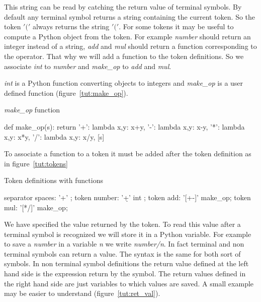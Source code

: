 This string can be read by catching the return value of terminal symbols. By default any terminal symbol returns a string containing the current token. So the token $'('$ always returns the string $'('$. For some tokens it may be useful to compute a Python object from the token. For example \emph{number} should return an integer instead of a string, \emph{add} and \emph{mul} should return a function corresponding to the operator. That why we will add a function to the token definitions. So we associate \emph{int} to \emph{number} and \emph{make\_op} to \emph{add} and \emph{mul}.

\emph{int} is a Python function converting objects to integers and \emph{make\_op} is a user defined function (figure~\ref{tut:make_op}).

\begin{code}
\caption{\emph{make\_op} function} \label{tut:make_op}
\begin{verbatimtab}[4]
def make_op(s):
	return {
		'+': lambda x,y: x+y,
		'-': lambda x,y: x-y,
		'*': lambda x,y: x*y,
		'/': lambda x,y: x/y,
	}[s]
\end{verbatimtab}
\end{code}

To associate a function to a token it must be added after the token definition as in figure~\ref{tut:tokens}

\begin{code}
\caption{Token definitions with functions} \label{tut:tokens}
\begin{verbatimtab}[4]
	separator spaces: '\s+' ;
	token number: '\d+' int ;
	token add: '[+-]' make_op;
	token mul: '[*/]' make_op;
\end{verbatimtab}
\end{code}

We have specified the value returned by the token. To read this value after a terminal symbol is recognized we will store it in a Python variable. For example to save a \emph{number} in a variable \emph{n} we write \emph{number/n}.
In fact terminal and non terminal symbols can return a value. The syntax is the same for both sort of symbols. In non terminal symbol definitions the return value defined at the left hand side is the expression return by the symbol. The return values defined in the right hand side are just variables to which values are saved. A small example may be easier to understand (figure~\ref{tut:ret_val}).


